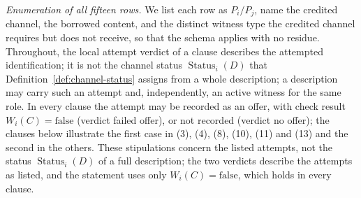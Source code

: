 \documentclass[11pt]{article}
\theoremstyle{definition}
\newcommand{\Status}[2]{\ensuremath{\operatorname{Status}_{#1}\!\left(#2\right)}}
\begin{document}
\emph{Enumeration of all fifteen rows.} We list each row as
\(P_i/P_j\), name the credited channel, the borrowed content, and the
distinct witness type the credited channel requires but does not receive, so
that the schema applies with no residue. Throughout, the local attempt verdict of a clause describes the attempted
identification; it is not the channel status \(\Status{i}{D}\) that
Definition~\ref{def:channel-status} assigns from a whole description; a
description may carry such an attempt and, independently, an active witness
for the same role. In every clause the attempt may be recorded as an offer, with check result
\(W_i(C)=\mathrm{false}\) (verdict failed offer), or not recorded (verdict no
offer); the clauses below illustrate the first case in (3), (4), (8), (10),
(11) and (13) and the second in the others.
These stipulations concern the listed attempts, not the status
\(\Status{i}{D}\) of a full description; the two verdicts describe the
attempts as listed, and the statement uses only
\(W_i(C)=\mathrm{false}\), which holds in every clause.
\end{document}
